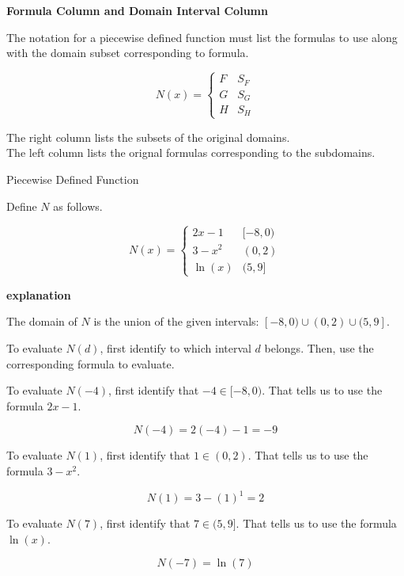 \documentclass{ximera}
\begin{document}
\begin{notation} \textbf{\textcolor{red!50!green}{Formula Column and Domain Interval Column}} 


The notation for a piecewise defined function must list the formulas to use along with the domain subset corresponding to formula.



\[
N(x) = 
\begin{cases}
  F & S_F     \\
  G & S_G \\
  H & S_H
\end{cases}
\]



The right column lists the subsets of the original domains.  \\
The left column lists the orignal formulas corresponding to the subdomains.

\end{notation}






\begin{example} Piecewise Defined Function

Define $N$ as follows.


\[
N(x) = 
\begin{cases}
  2x - 1   &    [-8, 0)     \\
  3 - x^2  &    (0, 2) \\
  \ln(x)    &    (5, 9]
\end{cases}
\]


\textbf{\textcolor{red!75!green}{explanation}} 

The domain of $N$ is the union of the given intervals: $[-8, 0) \cup (0,2) \cup (5, 9]$.


To evaluate $N(d)$, first identify to which interval $d$ belongs.  Then, use the corresponding formula to evaluate.









To evaluate $N(-4)$, first identify that $-4 \in [-8, 0)$.  That tells us to use the formula $2x - 1$. 

\[  N(-4) = 2(-4) - 1 = -9  \]





To evaluate $N(1)$, first identify that $1 \in (0, 2)$.  That tells us to use the formula $3 - x^2$. 

\[  N(1) = 3 - (1)^1 = 2  \]





To evaluate $N(7)$, first identify that $7 \in (5, 9]$.  That tells us to use the formula $\ln(x)$. 

\[  N(-7) = \ln(7)  \]



\end{example}
\end{document}
